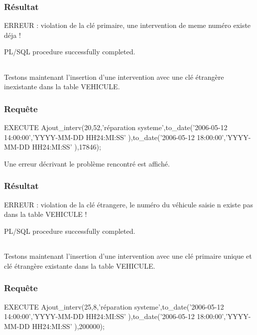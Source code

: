 \documentclass[•]{article}
\begin{document}
\subsubsection{Résultat}
\begin{sql}
ERREUR : violation de la clé primaire, une intervention de meme numéro existe déja !

PL/SQL procedure successfully completed.
\end{sql}

\texttt{  }\\

Testons maintenant l'insertion d'une intervention avec une clé étrangère inexistante dans la table VEHICULE.
\subsubsection{Requête}
\begin{sql}
EXECUTE Ajout_interv(20,52,'réparation systeme',to_date('2006-05-12 14:00:00','YYYY-MM-DD HH24:MI:SS' ),to_date('2006-05-12 18:00:00','YYYY-MM-DD HH24:MI:SS' ),17846);

\end{sql}

Une erreur décrivant le problème rencontré est affiché.

\subsubsection{Résultat}
\begin{sql}
ERREUR : violation de la clé étrangere, le numéro du véhicule saisie n existe pas dans la table VEHICULE !

PL/SQL procedure successfully completed.
\end{sql}

\texttt{  }\\

Testons maintenant l'insertion d'une intervention avec une clé primaire unique et clé étrangère existante dans la table VEHICULE.
\subsubsection{Requête}
\begin{sql}
EXECUTE Ajout_interv(25,8,'réparation systeme',to_date('2006-05-12 14:00:00','YYYY-MM-DD HH24:MI:SS' ),to_date('2006-05-12 18:00:00','YYYY-MM-DD HH24:MI:SS' ),200000);

\end{sql}
\end{document}
